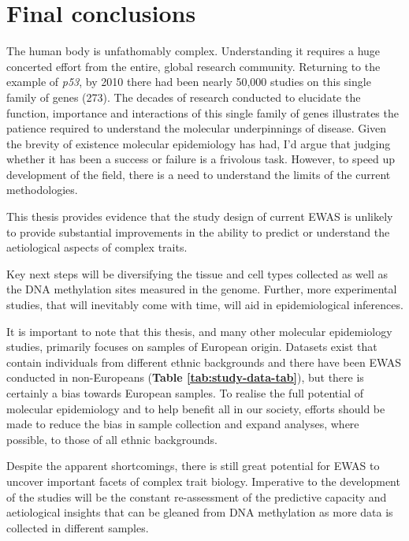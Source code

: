 \documentclass[11pt,twoside]{bristolthesis}
\begin{document}
\hypertarget{final-conclusions}{%
\section{Final conclusions}\label{final-conclusions}}

The human body is unfathomably complex. Understanding it requires a huge concerted effort from the entire, global research community. Returning to the example of \emph{p53}, by 2010 there had been nearly 50,000 studies on this single family of genes (273). The decades of research conducted to elucidate the function, importance and interactions of this single family of genes illustrates the patience required to understand the molecular underpinnings of disease. Given the brevity of existence molecular epidemiology has had, I'd argue that judging whether it has been a success or failure is a frivolous task. However, to speed up development of the field, there is a need to understand the limits of the current methodologies.

This thesis provides evidence that the study design of current EWAS is unlikely to provide substantial improvements in the ability to predict or understand the aetiological aspects of complex traits.

Key next steps will be diversifying the tissue and cell types collected as well as the DNA methylation sites measured in the genome. Further, more experimental studies, that will inevitably come with time, will aid in epidemiological inferences.

It is important to note that this thesis, and many other molecular epidemiology studies, primarily focuses on samples of European origin. Datasets exist that contain individuals from different ethnic backgrounds and there have been EWAS conducted in non-Europeans (\textbf{Table \ref{tab:study-data-tab}}), but there is certainly a bias towards European samples. To realise the full potential of molecular epidemiology and to help benefit all in our society, efforts should be made to reduce the bias in sample collection and expand analyses, where possible, to those of all ethnic backgrounds.

Despite the apparent shortcomings, there is still great potential for EWAS to uncover important facets of complex trait biology. Imperative to the development of the studies will be the constant re-assessment of the predictive capacity and aetiological insights that can be gleaned from DNA methylation as more data is collected in different samples.
\end{document}
